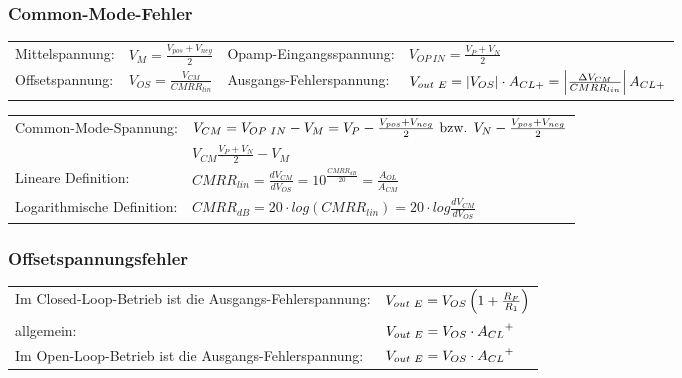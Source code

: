 		\subsubsection{Common-Mode-Fehler}
				\begin{tabular}{llll}
					Mittelspannung: &
					$V_M=\frac{V_{pos}+V_{neg}}{2}$ &
					Opamp-Eingangsspannung: &
					$V_{OP\ IN}=\frac{V_P+V_N}{2}$\\					
					Offsetspannung: &
					$V_{OS}=\frac{V_{CM}}{CMRR_{lin}}$ &
					Ausgangs-Fehlerspannung: &
					$V_{out \hspace{1mm} E}=\left|V_{OS}\right| \cdot A_{CL+}=\left|
					\frac{\Delta V_{CM}}{CMRR_{lin}}\right|A_{CL+}$\\
				\end{tabular}
				
				\begin{tabular}{ll}
        	Common-Mode-Spannung: &
          $V_{CM}=V_{OP \hspace{1mm} IN}-V_M=V_P- \frac{V_{pos}+V_{neg}}{2} \mbox{ bzw. }V_N- \frac{V_{pos}+V_{neg}}{2}$\\
          & $V_{CM}\frac{V_{P}+V_{N}}{2}-V_M$ \\
          Lineare Definition: &
          $CMRR_{lin}=\frac{dV_{CM}}{dV_{OS}}=10^{\frac{CMRR_{dB}}{20}}=\frac{A_{OL}}{A_{CM}}$\\
          Logarithmische Definition: &
          $CMRR_{dB}=20 \cdot log(CMRR_{lin})=20 \cdot
          log\frac{dV_{CM}}{dV_{OS}}$\\
				\end{tabular}
		
		\subsubsection{Offsetspannungsfehler}
				\begin{tabular}{ll}
					Im Closed-Loop-Betrieb ist die Ausgangs-Fehlerspannung: &
					$V_{out \hspace{1mm}E}=V_{OS}\left( 1+\frac{R_F}{R_1}\right)$\\
          allgemein: &
          $V_{out \hspace{1mm}E}=V_{OS} \cdot {A_{CL}}^{+}$\\
          Im Open-Loop-Betrieb ist die Ausgangs-Fehlerspannung: &
          $V_{out \hspace{1mm}E}=V_{OS}\cdot {A_{CL}}^{+}$\\
         \end{tabular}
		
